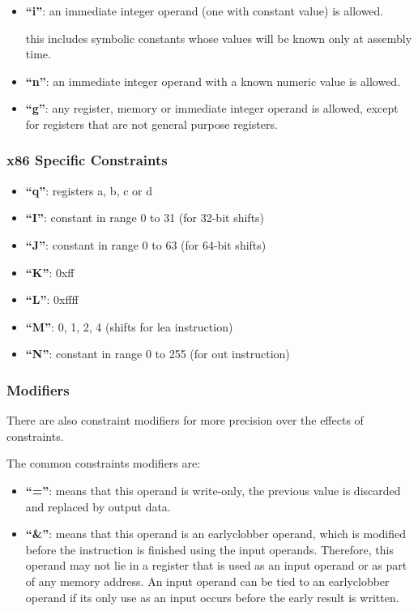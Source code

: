 {\begin{frame}
  \begin{itemize}[<+->]
    \item
      \textbf{``i''}: an immediate integer operand (one with constant
      value) is allowed.

      \nl

      this includes symbolic constants whose values will be known only at
      assembly time.
    \item
      \textbf{``n''}: an immediate integer operand with a known numeric
      value is allowed.
    \item
      \textbf{``g''}: any register, memory or immediate integer operand
      is allowed, except for registers that are not general purpose registers.
  \end{itemize}
\end{frame}


\begin{frame}
  \frametitle{x86 Specific Constraints}

  \begin{itemize}[<+->]
    \item
      \textbf{``q''}: registers a, b, c or d
    \item
      \textbf{``I''}: constant in range 0 to 31 (for 32-bit shifts)
    \item
      \textbf{``J''}: constant in range 0 to 63 (for 64-bit shifts)
    \item
      \textbf{``K''}: 0xff
    \item
      \textbf{``L''}: 0xffff
    \item
      \textbf{``M''}: 0, 1, 2, 4 (shifts for lea instruction)
    \item
      \textbf{``N''}: constant in range 0 to 255 (for out instruction)
  \end{itemize}
\end{frame}


\begin{frame}
  \frametitle{Modifiers}

  There are also constraint modifiers for more precision over the effects
  of constraints.

  \nl

  The common constraints modifiers are:

  \begin{itemize}[<+->]
    \item
      \textbf{``=''}: means that this operand is write-only, the previous
      value is discarded and replaced by output data.
    \item
      \textbf{``\&''}: means that this operand is an earlyclobber operand,
      which is modified before the instruction is finished using the input
      operands. Therefore, this operand may not lie in a register
      that is used as an input operand or as part of any memory address.
      An input operand can be tied to an earlyclobber operand if its
      only use as an input occurs before the early result is written.
  \end{itemize}
\end{frame}

}

